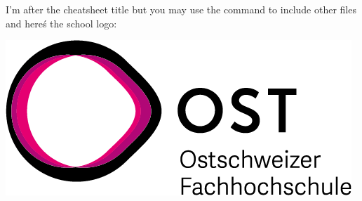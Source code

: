 \documentclass[8pt, a4paper, twoside, landscape]{extarticle}
\begin{document}
    \begin{multicols}{3}
        \raggedcolumns
        \cheatsheettitle
       I'm after the cheatsheet title but you may use the \verb!! command to include other files
       and hereś the school logo:
        \begin{center}
            \includegraphics[width=0.5\columnwidth]{Images/OSTLogo.png}
        \end{center}
    \end{multicols}
\end{document}
